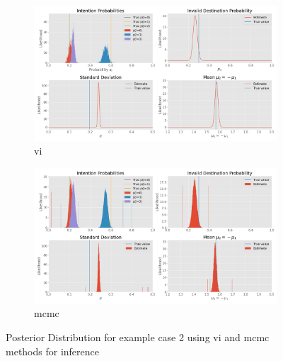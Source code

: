 \begin{figure}[h]
    \centering
    \begin{subfigure}{\textwidth}
    \includegraphics[width=\textwidth]{figures/example_2_vi_posterior.png}
    \caption{\acrshort{vi}}
    \end{subfigure}
    \begin{subfigure}{\textwidth}
    \includegraphics[width=\textwidth]{figures/example_2_mcmc_posterior.png}
    \caption{\acrshort{mcmc}}
    \end{subfigure}
    \caption{Posterior Distribution for example case 2 using \acrshort{vi} and \acrshort{mcmc} methods for inference}
    \label{fig:example_case_2}
\end{figure}

